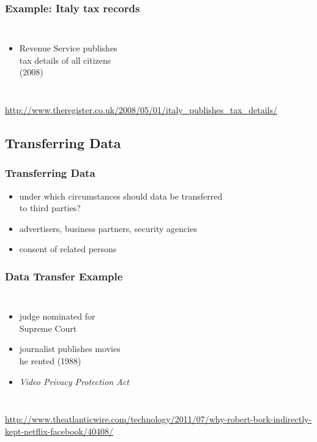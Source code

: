 \documentclass[dvipsnames]{beamer}
\theoremstyle{plain}
\begin{document}
\begin{frame}
  \frametitle{Example: Italy tax records}

  \begin{columns}

    \begin{itemize}
      \item Revenue Service publishes\\
        tax details of all citizens\\
        (2008)
    \end{itemize}
  \end{columns}

  \medskip
  \tiny{\url{http://www.theregister.co.uk/2008/05/01/italy_publishes_tax_details/}}\\
\end{frame}

\subsection{Transferring Data}

\begin{frame}
  \frametitle{Transferring Data}

  \begin{itemize}
    \item under which circumstances should data be transferred\\
      to third parties?
    \item advertisers, business partners, security agencies
    \item consent of related persons
  \end{itemize}
\end{frame}

\begin{frame}
  \frametitle{Data Transfer Example}

  \begin{columns}

    \begin{itemize}
      \item judge nominated for\\
        Supreme Court
      \item journalist publishes movies\\
        he rented (1988)

      \medskip
      \item \emph{Video Privacy Protection Act}
    \end{itemize}
  \end{columns}

  \medskip
  \tiny{\url{http://www.theatlanticwire.com/technology/2011/07/why-robert-bork-indirectly-kept-netflix-facebook/40408/}}\\
\end{frame}
\end{document}
